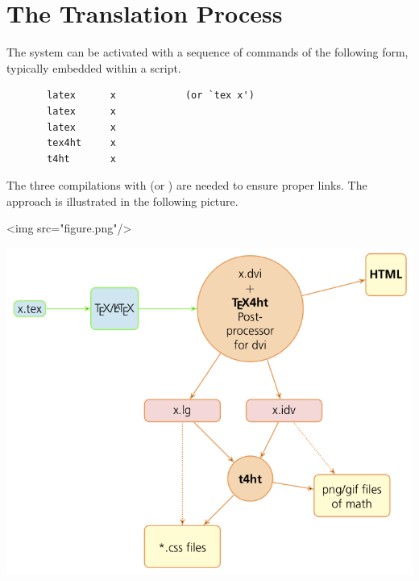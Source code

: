 \documentclass[a4paper]{article}
\begin{document}
\section{The Translation Process}
The system can be activated with a sequence of
commands of the following form, typically embedded within a script.

\begin{verbatim}
       latex      x            (or `tex x')
       latex      x
       latex      x
       tex4ht     x
       t4ht       x
\end{verbatim}


The three compilations with \latex (or \tex) are needed to ensure
proper links.  The approach is illustrated in the following picture.

\ifhtml
 \Tg<img src="figure.png"/>
\else
 \begin{center}
  \includegraphics{figure.png}
 \end{center}
\fi
\end{document}

